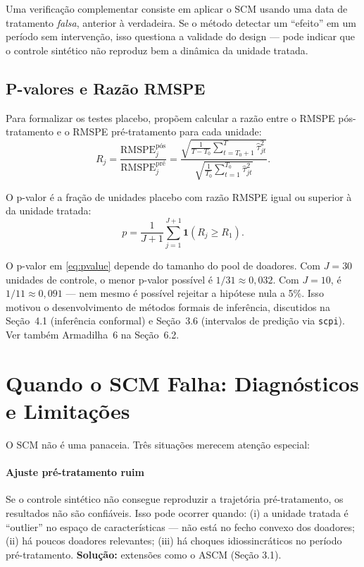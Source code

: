 \documentclass[12pt, a4paper, openany]{book}
\begin{document}
Uma verificação complementar consiste em aplicar o SCM usando uma data de tratamento \textit{falsa}, anterior à verdadeira. Se o método detectar um ``efeito'' em um período sem intervenção, isso questiona a validade do design --- pode indicar que o controle sintético não reproduz bem a dinâmica da unidade tratada.

\subsection{P-valores e Razão RMSPE}

Para formalizar os testes placebo, \cite{AbadieDiamondHainmueller2015} propõem calcular a razão entre o RMSPE pós-tratamento e o RMSPE pré-tratamento para cada unidade:
\begin{equation}
  R_j = \frac{\text{RMSPE}_j^{\text{pós}}}{\text{RMSPE}_j^{\text{pré}}} = \frac{\sqrt{\frac{1}{T-T_0} \sum_{t=T_0+1}^{T} \hat{\tau}_{jt}^2}}{\sqrt{\frac{1}{T_0} \sum_{t=1}^{T_0} \hat{\tau}_{jt}^2}}.
  \label{eq:rmspe_ratio}
\end{equation}

O p-valor é a fração de unidades placebo com razão RMSPE igual ou superior à da unidade tratada:
\begin{equation}
  p = \frac{1}{J+1} \sum_{j=1}^{J+1} \mathbf{1}(R_j \geq R_1).
  \label{eq:pvalue}
\end{equation}

\begin{notabox}
O p-valor em \eqref{eq:pvalue} depende do tamanho do pool de doadores. Com $J = 30$ unidades de controle, o menor p-valor possível é $1/31 \approx 0{,}032$. Com $J = 10$, é $1/11 \approx 0{,}091$ --- nem mesmo é possível rejeitar a hipótese nula a 5\%. Isso motivou o desenvolvimento de métodos formais de inferência, discutidos na Seção~4.1 (inferência conformal) e Seção~3.6 (intervalos de predição via \texttt{scpi}). Ver também Armadilha~6 na Seção~6.2.
\end{notabox}


\section{Quando o SCM Falha: Diagnósticos e Limitações}

O SCM não é uma panaceia. Três situações merecem atenção especial:

\paragraph{Ajuste pré-tratamento ruim} Se o controle sintético não consegue reproduzir a trajetória pré-tratamento, os resultados não são confiáveis. Isso pode ocorrer quando: (i) a unidade tratada é ``outlier'' no espaço de características --- não está no fecho convexo dos doadores; (ii) há poucos doadores relevantes; (iii) há choques idiossincráticos no período pré-tratamento. \textbf{Solução:} extensões como o ASCM (Seção 3.1).
\end{document}
